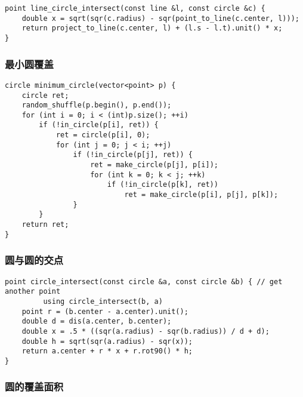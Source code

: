 \documentclass{article}
\begin{document}
\begin{lstlisting}
point line_circle_intersect(const line &l, const circle &c) {
    double x = sqrt(sqr(c.radius) - sqr(point_to_line(c.center, l)));
    return project_to_line(c.center, l) + (l.s - l.t).unit() * x;
}
\end{lstlisting}

\subsubsection{最小圆覆盖}

\begin{lstlisting}
circle minimum_circle(vector<point> p) {
    circle ret;
    random_shuffle(p.begin(), p.end());
    for (int i = 0; i < (int)p.size(); ++i)
        if (!in_circle(p[i], ret)) {
            ret = circle(p[i], 0);
            for (int j = 0; j < i; ++j)
                if (!in_circle(p[j], ret)) {
                    ret = make_circle(p[j], p[i]);
                    for (int k = 0; k < j; ++k)
                        if (!in_circle(p[k], ret))
                            ret = make_circle(p[i], p[j], p[k]);
                }
        }
    return ret;
}
\end{lstlisting}

\subsubsection{圆与圆的交点}

\begin{lstlisting}
point circle_intersect(const circle &a, const circle &b) { // get another point
         using circle_intersect(b, a)
    point r = (b.center - a.center).unit();
    double d = dis(a.center, b.center);
    double x = .5 * ((sqr(a.radius) - sqr(b.radius)) / d + d);
    double h = sqrt(sqr(a.radius) - sqr(x));
    return a.center + r * x + r.rot90() * h;
}
\end{lstlisting}

\subsubsection{圆的覆盖面积}
\end{document}
